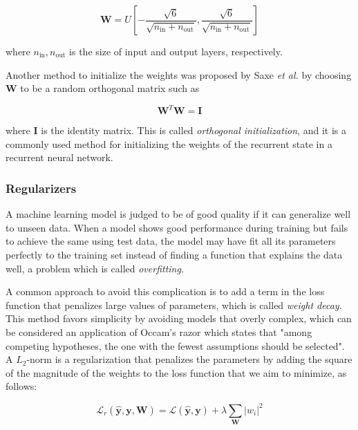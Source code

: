 \documentclass{kththesis}
\begin{document}
\begin{equation}
\mathbf{W} = \mathit{U}[-\frac{\sqrt{6}}{\sqrt{n_\text{in}+n_\text{out}}}, \frac{\sqrt{6}}{\sqrt{n_\text{in}+n_\text{out}}}] 
\end{equation}

where $n_\text{in}, n_\text{out}$ is the size of input and output layers, respectively. 

Another method to initialize the weights was proposed by Saxe \emph{et al.}\citep{saxe2013exact} by choosing $\mathbf{W}$ to be a random orthogonal matrix such as 

\begin{equation}
\mathbf{W}^T\mathbf{W} = \mathbf{I}
\end{equation}

where $\mathbf{I}$ is the identity matrix. This is called \emph{orthogonal initialization}, and it is a commonly used method for initializing the weights of the recurrent state in a recurrent neural network.

\subsubsection{Regularizers}

A machine learning model is judged to be of good quality if it can generalize well to unseen data. When a model shows good performance during training but fails to achieve the same using test data, the model may have fit all its parameters perfectly to the training set instead of finding a function that explains the data well, a problem which is called \emph{overfitting}. 

A common approach to avoid this complication is to add a term in the loss function that penalizes large values of parameters, which is called \emph{weight decay}. This method favors simplicity by avoiding models that overly complex, which can be considered an application of Occam's razor which states that "among competing hypotheses, the one with the fewest assumptions should be selected". A $L_2$-norm is a regularization that penalizes the parameters by adding the square of the magnitude of the weights to the loss function that we aim to minimize\citep{phaisangittisagul2016analysis}, as follows:

\begin{equation}
\mathcal{L}_r(\hat{\mathbf{y}}, \mathbf{y}, \mathbf{W}) = \mathcal{L}(\hat{\mathbf{y}}, \mathbf{y}) + \lambda \sum_\mathbf{W} |w_i|^2
\end{equation}
 
\end{document}
